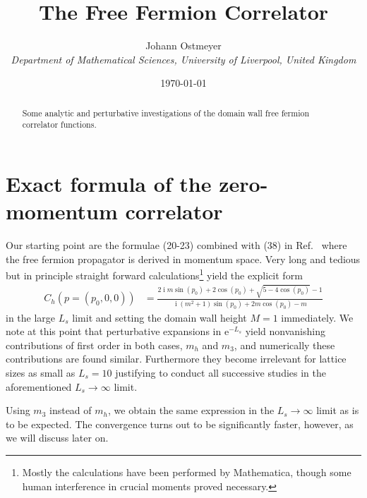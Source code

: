 \documentclass[a4paper]{article}
\DeclareMathOperator{\im}{i}
\newcommand{\eto}[1]{\ensuremath{\mathrm{e}^{#1}}}
\newcommand{\liverpool}{
\\\textit{\footnotesize Department of Mathematical Sciences,
	University of Liverpool, United Kingdom}
}
\begin{document}
	\title{The Free Fermion Correlator}
	
	\author{Johann Ostmeyer\liverpool}
	\date{\today}
	\maketitle
	
	\begin{abstract}
		Some analytic and perturbative investigations of the domain wall free fermion correlator functions.
	\end{abstract}

	\allowdisplaybreaks[1]

	\section{Exact formula of the zero-momentum correlator}
	Our starting point are the formulae (20-23) combined with (38) in Ref.~\cite{hands_thirring2016} where the free fermion propagator is derived in momentum space. Very long and tedious but in principle straight forward calculations\footnote{Mostly the calculations have been performed by Mathematica, though some human interference in crucial moments proved necessary.} yield the explicit form
	\begin{align}
		C_h(p=(p_0,0,0)) &= \frac{2 \im m \sin (p_0)+2 \cos (p_0)+\sqrt{5-4 \cos (p_0)}-1}{\im \left(m^2+1\right) \sin (p_0)+2 m \cos (p_0)-m}\label{eq:exact_mom_prop_h}
	\end{align}
	in the large $L_s$ limit and setting the domain wall height $M=1$ immediately. We note at this point that perturbative expansions in $\eto{-L_s}$ yield nonvanishing contributions of first order in both cases, $m_h$ and $m_3$, and numerically these contributions are found similar. Furthermore they become irrelevant for lattice sizes as small as $L_s=10$ justifying to conduct all successive studies in the aforementioned $L_s\rightarrow\infty$ limit.
	
	Using $m_3$ instead of $m_h$, we obtain the same expression in the $L_s\rightarrow\infty$ limit as is to be expected. The convergence turns out to be significantly faster, however, as we will discuss later on.
	
\end{document}
